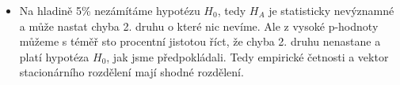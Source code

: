 \documentclass[11pt]{article}
\providecommand{\tightlist}{%
      \setlength{\itemsep}{0pt}\setlength{\parskip}{0pt}}
\begin{document}
    \begin{itemize}
\tightlist
\item
  Na hladině 5\% nezámítáme hypotézu \(H_0\), tedy \(H_A\) je
  statisticky nevýznamné a může nastat chyba 2. druhu o které nic
  nevíme. Ale z vysoké p-hodnoty můžeme s téměř sto procentní jistotou
  říct, že chyba 2. druhu nenastane a platí hypotéza \(H_0\), jak jsme
  předpokládali. Tedy empirické četnosti a vektor stacionárního
  rozdělení mají shodné rozdělení.
\end{itemize}


    
    
    
    
\end{document}
